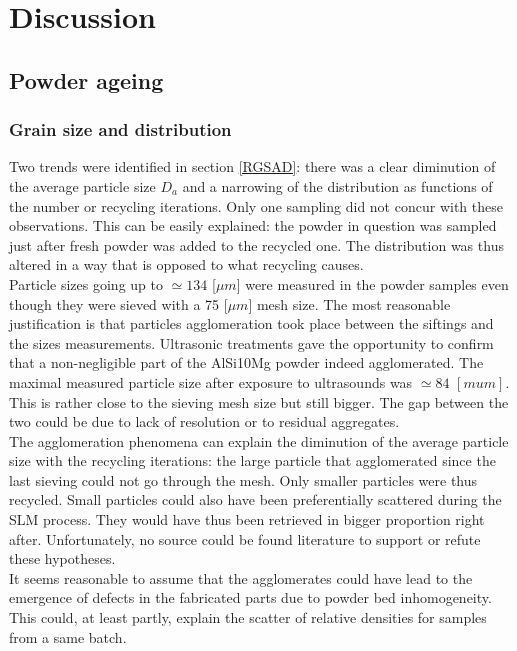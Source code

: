 \chapter{Discussion}
\label{Chap5}
\section{Powder ageing}
\subsection{Grain size and distribution}

Two trends were identified in section \ref{RGSAD}: there was a clear diminution of the average particle size $D_a$ and a narrowing of the distribution as functions of the number or recycling iterations. Only one sampling did not concur with these observations. This can be easily explained: the powder in question was sampled just after fresh powder was added to the recycled one. The distribution was thus altered in a way that is opposed to what recycling causes. \\

Particle sizes going up to $\simeq 134$ [$\mu m$] were measured in the powder samples even though they were sieved with a 75 [$\mu m$] mesh size. The most reasonable justification is that particles agglomeration took place between the siftings and the sizes measurements. Ultrasonic treatments gave the opportunity to confirm that a non-negligible part of the AlSi10Mg powder indeed agglomerated. The maximal measured particle size after exposure to ultrasounds was $\simeq 84$ $[mu m]$. This is rather close to the sieving mesh size but still bigger. The gap between the two could be due to lack of resolution or to residual aggregates.\\

The agglomeration phenomena can explain the diminution of the average particle size with the recycling iterations: the large particle that agglomerated since the last sieving could not go through the mesh. Only smaller particles were thus recycled. Small particles could also have been preferentially scattered during the SLM process. They would have thus been retrieved in bigger proportion right after. Unfortunately, no source could be found literature to support or refute these hypotheses.\\

 It seems reasonable to assume that the agglomerates could have lead to the emergence of defects in the fabricated parts due to powder bed inhomogeneity. This could, at least partly, explain the scatter of relative densities for samples from a same batch. %
